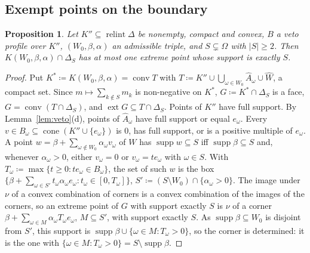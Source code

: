 \documentclass[11pt]{article}
\DeclareMathOperator{\conv}{conv}
\DeclareMathOperator{\cone}{cone}
\DeclareMathOperator{\relint}{relint}
\DeclareMathOperator{\supp}{supp}
\DeclareMathOperator{\ext}{ext}
\theoremstyle{plain}
\newtheorem{proposition}[theorem]{Proposition}
\theoremstyle{definition}
\theoremstyle{remark}
\begin{document}
\subsection{Exempt points on the boundary}

\begin{proposition}\label{prop:facecount}
Let $K''\subseteq\relint\Delta$ be nonempty, compact and convex, $B$ a veto profile over
$K''$, $(W_0,\beta,\alpha)$ an admissible triple, and $S\subsetneq\Omega$ with $|S|\ge2$.
Then $K(W_0,\beta,\alpha)\cap\Delta_S$ has at most one extreme point whose support is
exactly $S$.
\end{proposition}

\begin{proof}
Put $K^\ast\coloneqq K(W_0,\beta,\alpha)=\conv T$ with $T\coloneqq K''\cup\bigcup_{\omega
\in W_0}\hat A_\omega\cup\hat W$, a compact set. Since $m\mapsto\sum_{k\notin S}m_k$ is
non-negative on $K^\ast$, $G\coloneqq K^\ast\cap\Delta_S$ is a face, $G=\conv(T\cap\Delta
_S)$, and $\ext G\subseteq T\cap\Delta_S$. Points of $K''$ have full support. By
Lemma~\ref{lem:veto}(d), points of $\hat A_\omega$ have full support or equal $e_\omega$.
Every $v\in B_\omega\subseteq\cone(K''\cup\{e_\omega\})$ is $0$, has full support, or is a
positive multiple of $e_\omega$. A point $w=\beta+\sum_{\omega\notin W_0}\alpha_\omega
v_\omega$ of $W$ has $\supp w\subseteq S$ iff $\supp\beta\subseteq S$ and, whenever
$\alpha_\omega>0$, either $v_\omega=0$ or $v_\omega=te_\omega$ with $\omega\in S$. With
$T_\omega\coloneqq\max\{t\ge0:te_\omega\in B_\omega\}$, the set of such $w$ is the box
$\{\beta+\sum_{\omega\in S'}t_\omega\alpha_\omega e_\omega:t_\omega\in[0,T_\omega]\}$,
$S'\coloneqq(S\setminus W_0)\cap\{\alpha_\omega>0\}$. The image under $\nu$ of a convex
combination of corners is a convex combination of the images of the corners, so an
extreme point of $G$ with support exactly $S$ is $\nu$ of a corner $\beta+\sum_{\omega\in
M}\alpha_\omega T_\omega e_\omega$, $M\subseteq S'$, with support exactly $S$. As
$\supp\beta\subseteq W_0$ is disjoint from $S'$, this support is $\supp\beta\cup\{\omega\in
M:T_\omega>0\}$, so the corner is determined: it is the one with $\{\omega\in M:T_\omega>0
\}=S\setminus\supp\beta$.
\end{proof}
\end{document}

